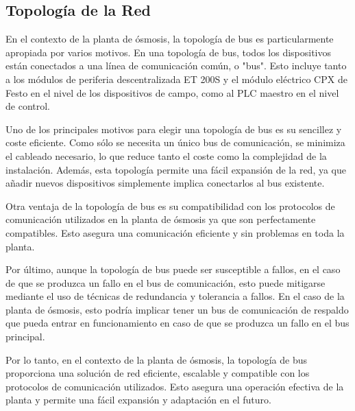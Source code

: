 \subsection{Topología de la Red}

En el contexto de la planta de ósmosis, la topología de bus es particularmente apropiada por varios motivos. En una topología de bus, todos los dispositivos están conectados a una línea de comunicación común, o "bus". Esto incluye tanto a los módulos de periferia descentralizada ET 200S y el módulo eléctrico CPX de Festo en el nivel de los dispositivos de campo, como al PLC maestro en el nivel de control.

Uno de los principales motivos para elegir una topología de bus es su sencillez y coste eficiente. Como sólo se necesita un único bus de comunicación, se minimiza el cableado necesario, lo que reduce tanto el coste como la complejidad de la instalación. Además, esta topología permite una fácil expansión de la red, ya que añadir nuevos dispositivos simplemente implica conectarlos al bus existente.

Otra ventaja de la topología de bus es su compatibilidad con los protocolos de comunicación utilizados en la planta de ósmosis ya que
son perfectamente compatibles. Esto asegura una comunicación eficiente y sin problemas en toda la planta.

Por último, aunque la topología de bus puede ser susceptible a fallos, en el caso de que se produzca un fallo en el bus de comunicación, esto puede mitigarse mediante el uso de técnicas de redundancia y tolerancia a fallos. En el caso de la planta de ósmosis, esto podría implicar tener un bus de comunicación de respaldo que pueda entrar en funcionamiento en caso de que se produzca un fallo en el bus principal.

Por lo tanto, en el contexto de la planta de ósmosis, la topología de bus proporciona una solución de red eficiente, escalable y compatible con los protocolos de comunicación utilizados. Esto asegura una operación efectiva de la planta y permite una fácil expansión y adaptación en el futuro.
